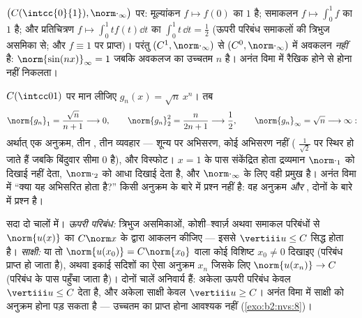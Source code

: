 \begin{example}\label{ex:b2:nvs:operatornorms}
$\bigl(C(\intcc{0}{1}), \norm\cdot_\infty\bigr)$ पर: मूल्यांकन $f \mapsto f(0)$ का  $1$ है; समाकलन $f \mapsto
\int_0^1 f$ का  $1$
है; और प्रतिचित्रण $f \mapsto \int_0^1 t f(t)\dd t$ का  $\int_0^1 t\,\dd t = \frac12$ (ऊपरी परिबंध समाकलों की त्रिभुज
असमिका से; और $f \equiv 1$ पर प्राप्त)। परंतु $(C^1, \norm\cdot_\infty)$ से $(C^0,
\norm\cdot_\infty)$ में अवकलन 
\emph{नहीं} है: $\norm{\sin(nx)}_\infty
= 1$ जबकि अवकलज का उच्चतम  $n$ है। अनंत विमा में
रैखिक होने से  होना नहीं निकलता।
\end{example}

\begin{example}[एक ही अनुक्रम पर दो मानदंड, दो निर्णय]\label{ex:b2:nvs:sqrtnxn}
$C(\intcc01)$ पर मान लीजिए $g_n(x) = \sqrt{n}\,x^n$। तब
\[
\norm{g_n}_1 = \frac{\sqrt n}{n + 1} \longrightarrow 0,
\qquad
\norm{g_n}_2^2 = \frac{n}{2n + 1} \longrightarrow \frac12,
\qquad
\norm{g_n}_\infty = \sqrt n \longrightarrow \infty :
\]
अर्थात् एक अनुक्रम, तीन , तीन व्यवहार --- शून्य पर अभिसरण, कोई
अभिसरण नहीं ( $\frac1{\sqrt2}$ पर स्थिर हो जाते हैं जबकि बिंदुवार सीमा $0$
है), और विस्फोट। $x = 1$ के पास संकेंद्रित होता द्रव्यमान $\norm\cdot_1$ को दिखाई नहीं
देता, $\norm\cdot_2$ को आधा दिखाई देता है, और $\norm\cdot_\infty$ के लिए वही प्रमुख है। अनंत विमा
में ``क्या यह अभिसरित होता है?'' किसी अनुक्रम के बारे में प्रश्न नहीं
है: वह अनुक्रम \emph{और} , दोनों के बारे में प्रश्न है।
\end{example}

\begin{method}[संकारक मानदंड का परिकलन]\label{met:b2:nvs:opnorm}
सदा दो चालों में। \emph{ऊपरी परिबंध:} त्रिभुज असमिकाओं, कोशी--श्वार्ज़
अथवा समाकल परिबंधों से $\norm{u(x)}$ का $C\norm x$ के द्वारा आकलन कीजिए --- इससे $\vertiii u
\leq C$
सिद्ध होता है। \emph{साक्षी:} या तो $\norm{u(x_0)} = C\norm{x_0}$ वाला कोई विशिष्ट $x_0 \neq 0$ दिखाइए
(परिबंध प्राप्त हो जाता है), अथवा इकाई सदिशों का ऐसा अनुक्रम $x_n$ जिसके
लिए $\norm{u(x_n)} \to C$ (परिबंध के पास पहुँचा जाता है)। दोनों चालें अनिवार्य हैं: अकेला
ऊपरी परिबंध केवल $\vertiii u \leq C$ देता है, और अकेला साक्षी केवल $\vertiii u \geq C$। अनंत विमा में
साक्षी को अनुक्रम होना पड़ सकता है --- उच्चतम का प्राप्त होना आवश्यक
नहीं (\cref{exo:b2:nvs:8})।
\end{method}

